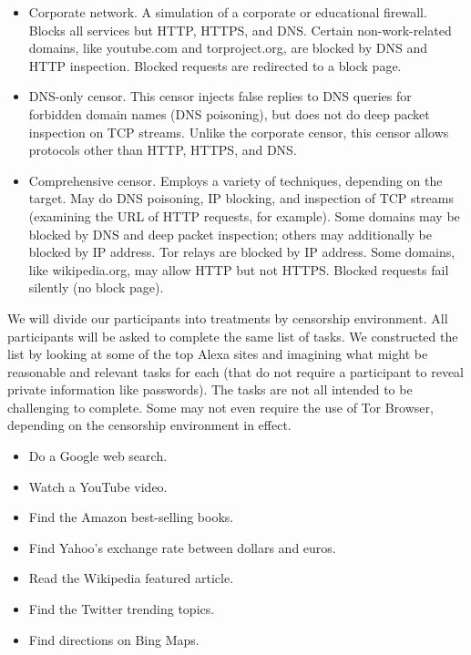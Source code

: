 \documentclass{sig-alternate-hotpets15}
\begin{document}
\begin{itemize} \itemsep1pt \parskip0pt 
\item{Corporate network.}
A simulation of a corporate or educational firewall.
Blocks all services but HTTP, HTTPS, and DNS.
Certain non-work-related domains, like youtube.com and torproject.org,
are blocked by DNS and HTTP inspection.
Blocked requests are redirected to a block page.
\item{DNS-only censor.}
This censor injects false replies to DNS queries
for forbidden domain names (DNS poisoning),
but does not do deep packet inspection on TCP streams.
Unlike the corporate censor, this censor allows protocols
other than HTTP, HTTPS, and DNS.
\item{Comprehensive censor.}
Employs a variety of techniques, depending on the target.
May do DNS poisoning, IP blocking, and inspection of TCP streams
(examining the URL of HTTP requests, for example).
Some domains may be blocked by DNS and deep packet inspection;
others may additionally be blocked by IP address.
Tor relays are blocked by IP address.
Some domains, like wikipedia.org, may allow HTTP but not HTTPS.
Blocked requests fail silently (no block page).
\end{itemize}

We will divide our participants into treatments
by censorship environment.
All participants will be asked to complete the same
list of tasks.
We constructed the list by looking at some of the top
Alexa sites and imagining what might be reasonable
and relevant tasks for each
(that do not require a participant to reveal private information
like passwords).
The tasks are not all intended to be challenging to complete.
Some may not even require the use of Tor Browser,
depending on the censorship environment in effect.

\begin{itemize} \itemsep1pt \parskip0pt 
\item Do a Google web search.
\item Watch a YouTube video.
\item Find the Amazon best-selling books.
\item Find Yahoo's exchange rate between dollars and euros.
\item Read the Wikipedia featured article.
\item Find the Twitter trending topics.
\item Find directions on Bing Maps.
\end{itemize}
\end{document}
